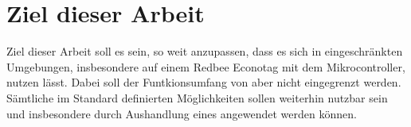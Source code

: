 \section{Ziel dieser Arbeit}
Ziel dieser Arbeit soll es sein,  so weit anzupassen, dass es sich in eingeschränkten Umgebungen, insbesondere auf einem Redbee Econotag \cite{econotag} mit dem
 \cite{mc1322} Mikrocontroller, nutzen lässt. Dabei soll der Funtkionsumfang von  aber nicht eingegrenzt werden. Sämtliche im Standard
definierten Möglichkeiten sollen weiterhin nutzbar sein und insbesondere durch Aushandlung eines  angewendet werden können.